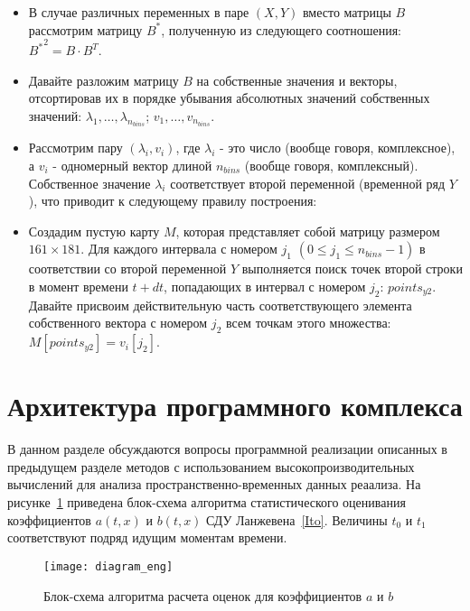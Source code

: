 \begin{itemize}
\begin{itemize}
		\item В случае различных переменных в паре $(X,Y)$ вместо матрицы $B$ рассмотрим матрицу $B^*$, полученную из следующего соотношения: ${B^*}^2= B \cdot B^T$.
		
		
		\item Давайте разложим матрицу $B$ на собственные значения и векторы, отсортировав их в порядке убывания абсолютных значений собственных значений: $\lambda_1,\dots,\lambda_{n_{bins}}$; $v_1,\dots,v_{n_{bins}}$.
		
		\item Рассмотрим пару $(\lambda_i, v_i)$, где $\lambda_i$ - это число (вообще говоря, комплексное), а $v_i$ - одномерный вектор длиной $n_{bins}$ (вообще говоря, комплексный). Собственное значение $\lambda_i$ соответствует второй переменной (временной ряд $Y$), что приводит к следующему правилу построения: 
		
		\item Создадим пустую карту $M$, которая представляет собой матрицу размером $161 \times 181$. Для каждого интервала с номером $j_1$ $(0 \leqslant j_1 \leqslant n_{bins}-1)$ в соответствии со второй переменной $Y$ выполняется поиск точек второй строки в момент времени $t+dt$, попадающих в интервал с номером $j_2$: $points_{y2}$. Давайте присвоим действительную часть соответствующего элемента собственного вектора с номером $j_2$ всем точкам этого множества: $M[points_{y2}] = v_i[j_2]$.
	\end{itemize}
\end{itemize}


\section{Архитектура программного комплекса}
\label{SecSoftware} 
В данном разделе обсуждаются вопросы программной реализации описанных в предыдущем разделе методов с использованием высокопроизводительных вычислений для анализа пространственно-временных данных реаализа. На рисунке~\ref{fig_algo} приведена блок-схема алгоритма статистического оценивания коэффициентов $a(t,x)$ и $b(t,x)$ СДУ Ланжевена~\eqref{Ito}. Величины $t_0$ и $t_1$ соответствуют подряд идущим моментам времени. 

\begin{figure}[!h]
	\centering
	\texttt{[image: diagram\_eng]}
	\caption{Блок-схема алгоритма расчета оценок для коэффициентов $a$ и $b$} \label{fig_algo}
\end{figure}

